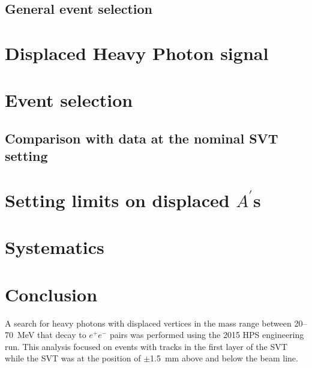 \documentclass[twoside]{article}
\begin{document}
\subsection{General event selection}

\section{Displaced Heavy Photon signal}

\section{Event selection}
\subsection{Comparison with data at the nominal SVT setting}

\section{Setting limits on displaced $A^{\prime}$s}

\section{Systematics}

\section{Conclusion}
A search for heavy photons with displaced vertices in the mass range between 20--70~MeV that decay to $e^+e^-$ pairs was performed using the 2015 HPS engineering run. This analysis focused on events with tracks in the first layer of the SVT while the SVT was at the position of $\pm$1.5~mm above and below the beam line. 

\
\end{document}

